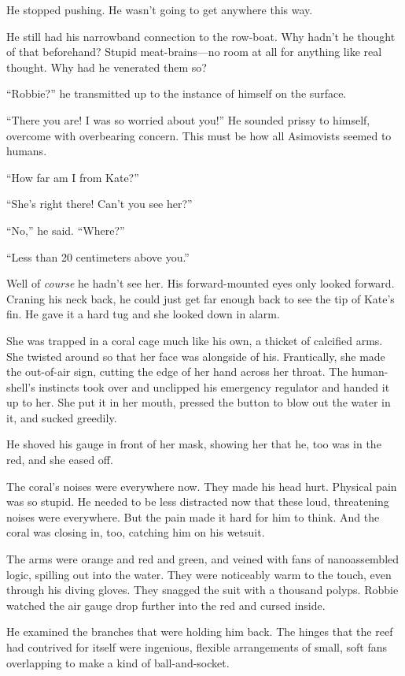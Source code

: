 He stopped pushing. He wasn’t going to get anywhere this way.

He still had his narrowband connection to the row-boat. Why hadn’t
he thought of that beforehand? Stupid meat-brains—no room at all
for anything like real thought. Why had he venerated them so?

“Robbie?” he transmitted up to the instance of himself on the
surface.

“There you are! I was so worried about you!” He sounded prissy to
himself, overcome with overbearing concern. This must be how all
Asimovists seemed to humans.

“How far am I from Kate?”

“She’s right there! Can’t you see her?”

“No,” he said. “Where?”

“Less than 20 centimeters above you.”

Well of \emph{course} he hadn’t see her. His forward-mounted eyes
only looked forward. Craning his neck back, he could just get far
enough back to see the tip of Kate’s fin. He gave it a hard tug and
she looked down in alarm.

She was trapped in a coral cage much like his own, a thicket of
calcified arms. She twisted around so that her face was alongside
of his. Frantically, she made the out-of-air sign, cutting the edge
of her hand across her throat. The human-shell’s instincts took
over and unclipped his emergency regulator and handed it up to her.
She put it in her mouth, pressed the button to blow out the water
in it, and sucked greedily.

He shoved his gauge in front of her mask, showing her that he, too
was in the red, and she eased off.

The coral’s noises were everywhere now. They made his head hurt.
Physical pain was so stupid. He needed to be less distracted now
that these loud, threatening noises were everywhere. But the pain
made it hard for him to think. And the coral was closing in, too,
catching him on his wetsuit.

The arms were orange and red and green, and veined with fans of
nanoassembled logic, spilling out into the water. They were
noticeably warm to the touch, even through his diving gloves. They
snagged the suit with a thousand polyps. Robbie watched the air
gauge drop further into the red and cursed inside.

He examined the branches that were holding him back. The hinges
that the reef had contrived for itself were ingenious, flexible
arrangements of small, soft fans overlapping to make a kind of
ball-and-socket.

